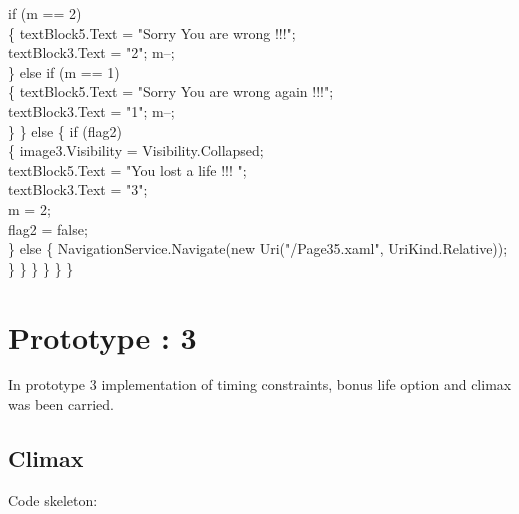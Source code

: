 {{                    if (m == 2)\\
                    \{
                        textBlock5.Text = "Sorry You are wrong !!!";\\
                        textBlock3.Text = "2"; m--;\\
                    \}
                    else if (m == 1)\\
                    \{
                        textBlock5.Text = "Sorry You are wrong again !!!";\\
                        textBlock3.Text = "1"; m--;\\
                    \}
                \}
                else
                \{
                    if (flag2)\\
                    \{
                        image3.Visibility = Visibility.Collapsed;\\
                        textBlock5.Text = "You lost a life !!! ";\\
                        textBlock3.Text = "3";\\
                        m = 2;\\
                        flag2 = false;\\
                    \}
                    else
                    \{
                        NavigationService.Navigate(new Uri("/Page35.xaml", UriKind.Relative));\\
                    \}
                \}
            \}
        \}
    \}
\}







\section{Prototype : 3}
\hspace{1cm}In prototype 3 implementation of timing constraints, bonus life option and climax was been carried.
\subsection{Climax}
\ttfamily \hspace{1cm}
Code skeleton:\\

}}
